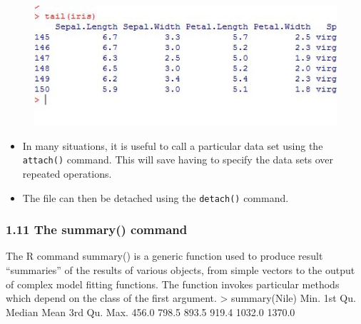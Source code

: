 \documentclass{beamer}
\begin{document}
 	\begin{frame}
 		\begin{figure}
 			\centering
 			\includegraphics[width=1.2\linewidth]{images/iristail}     
 		\end{figure}
 	\end{frame}   
 	\begin{frame}
 		\begin{itemize}
 			\item In many situations, it is useful to call a particular data set using the \texttt{attach()} command. This
 			will save having to specify the data sets over repeated operations. 
 			\item The file can then be detached
 			using the \texttt{detach()} command.
 		\end{itemize}
 		
 		
 		
 	\end{frame}
 	\begin{frame}
 		\frametitle{1.11 The summary() command}
 		The R command summary() is a generic function used to produce result “summaries” of the
 		results of various objects, from simple vectors to the output of complex model fitting functions.
 		The function invokes particular methods which depend on the class of the first argument.
 		> summary(Nile)
 		Min. 1st Qu. Median Mean 3rd Qu. Max.
 		456.0 798.5 893.5 919.4 1032.0 1370.0
 	\end{frame}
\end{document}
